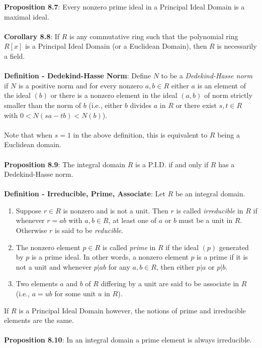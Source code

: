 \documentclass{article}
\begin{document}
\textbf{Proposition 8.7}: Every nonzero prime ideal in a Principal Ideal Domain is a maximal ideal. \\ \\
\textbf{Corollary 8.8}: If $R$ is any commutative ring such that the polynomial ring $R[x]$ is a Principal Ideal Domain (or a Euclidean Domain), then $R$ is necessarily a field. \\ \\
\textbf{Definition - Dedekind-Hasse Norm}: Define $N$ to be a \textit{Dedekind-Hasse norm} if $N$ is a positive norm and for every nonzero $a, b \in R$ either $a$ is an element of the ideal $(b)$ or there is a nonzero element in the ideal $(a, b)$ of norm strictly smaller than the norm of $b$ (i.e., either $b$ divides $a$ in $R$ or there exist $s, t \in R$ with $0 < N(sa - tb) < N(b)$). \\ \\
Note that when $s = 1$ in the above definition, this is equivalent to $R$ being a Euclidean domain. \\ \\
\textbf{Proposition 8.9}: The integral domain $R$ is a P.I.D. if and only if $R$ has a Dedekind-Hasse norm. \\ \\
\textbf{Definition - Irreducible, Prime, Associate}: Let $R$ be an integral domain. \begin{enumerate}
    \item Suppose $r \in R$ is nonzero and is not a unit. Then $r$ is called \textit{irreducible} in $R$ if whenever $r = ab$ with $a, b \in R$, at least one of $a$ or $b$ must be a unit in $R$. Otherwise $r$ is said to be \textit{reducible}.
    \item The nonzero element $p \in R$ is called \textit{prime} in $R$ if the ideal $(p)$ generated by $p$ is a prime ideal. In other words, a nonzero element $p$ is a prime if it is not a unit and whenever $p | ab$ for any $a, b \in R$, then either $p | a$ or $p | b$.
    \item Two elements $a$ and $b$ of $R$ differing by a unit are said to be associate in $R$ (i.e., $a = ub$ for some unit $u$ in $R$).
\end{enumerate} $ $ \\
If $R$ is a Principal Ideal Domain however, the notions of prime and irreducible elements are the same. \\ \\
\textbf{Proposition 8.10}: In an integral domain a prime element is always irreducible. \\ \\
\end{document}
